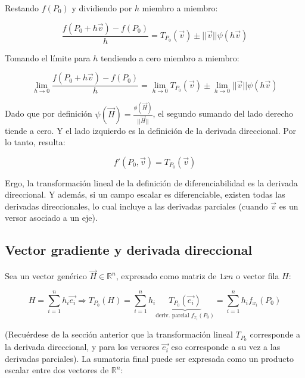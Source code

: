\documentclass{article}
\renewcommand{\Bbb}{\mathbb}
\begin{document}
Restando $f(P_0)$ y dividiendo por $h$ miembro a miembro:

\begin{equation}
\frac{f(P_0 + h\overrightarrow{v})-f(P_0)}{h} = T_{P_0}(\overrightarrow{v}) \pm ||\overrightarrow{v}|| \psi(h \overrightarrow{v})
\end{equation}

Tomando el límite para $h$ tendiendo a cero miembro a miembro:

\begin{equation}
\lim_{h \rightarrow 0} \frac{f(P_0 + h\overrightarrow{v})-f(P_0)}{h} = \lim_{h \rightarrow 0} T_{P_0}(\overrightarrow{v}) \pm \lim_{h \rightarrow 0} ||\overrightarrow{v}|| \psi(h \overrightarrow{v}) 
\end{equation}

Dado que por definición $\psi(\overrightarrow{H}) = \frac{\phi(\overrightarrow{H})}{||\overrightarrow{H}||}$, el segundo sumando del lado derecho tiende a cero. Y el lado izquierdo es la definición de la derivada direccional. Por lo tanto, resulta:

\begin{equation}
f'(P_0, \overrightarrow{v}) = T_{P_0}(\overrightarrow{v})
\end{equation}

Ergo, la transformación lineal de la definición de diferenciabilidad es la derivada direccional. Y además, si un campo escalar es diferenciable, existen todas las derivadas direccionales, lo cual incluye a las derivadas parciales (cuando $\overrightarrow{v}$ es un versor asociado a un eje).

\subsection{Vector gradiente y derivada direccional}

Sea un vector genérico $\overrightarrow{H} \in \Bbb R^n$, expresado como matriz de $1xn$ o vector fila $H$:

\begin{equation}
H = \sum\limits_{i=1}^{n} {h_i \overrightarrow{e_i}} \Rightarrow T_{P_0}(H) = \sum\limits_{i=1}^{n}{ h_i \underbrace{T_{P_0}(\overrightarrow{e_i})}_{\text{deriv. parcial } f_{x_i}(P_0)} } = \sum\limits_{i=1}^{n}{ h_i f_{x_i}(P_0) }
\end{equation}

(Recuérdese de la sección anterior que la transformación lineal $T_{P_0}$ corresponde a la derivada direccional, y para los versores $\overrightarrow{e_i}$ eso corresponde a su vez a las derivadas parciales). La sumatoria final puede ser expresada como un producto escalar entre dos vectores de $\Bbb R^n$:
\end{document}

